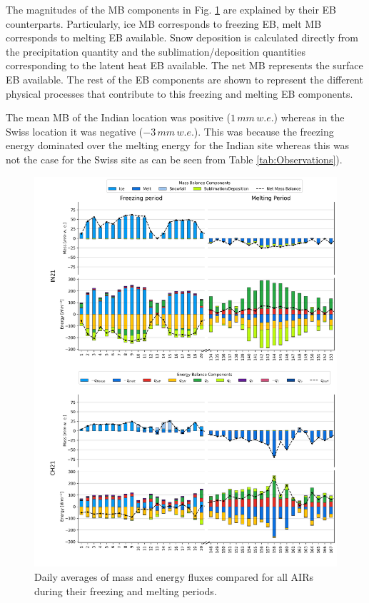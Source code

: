\documentclass[utf8]{frontiersSCNS} %
\begin{document}
The magnitudes of the MB components in Fig. \ref{fig:MEB} are explained by their EB counterparts.  Particularly,
ice MB corresponds to freezing EB, melt MB corresponds to melting EB available.  Snow deposition is calculated
directly from the precipitation quantity and the sublimation/deposition quantities corresponding to the latent
heat EB available. The net MB represents the surface EB available. The rest of the EB components are shown to represent the different physical processes that
contribute to this freezing and melting EB components.

The mean MB of the Indian location was positive ($1\, mm \,w.e.$) whereas in the Swiss location it was negative
($-3\, mm \,w.e.$). This was because the freezing energy dominated over the melting energy for the Indian site
whereas this was not the case for the Swiss site as can be seen from Table \ref{tab:Observations}).

\begin{figure}
	\begin{center}
		\includegraphics[width=\linewidth]{Figures/mass_energy_bal.jpg} \end{center}
	\caption{Daily averages of mass and energy fluxes compared for all AIRs during their freezing and melting periods.
	} \label{fig:MEB}
\end{figure}
\end{document}
